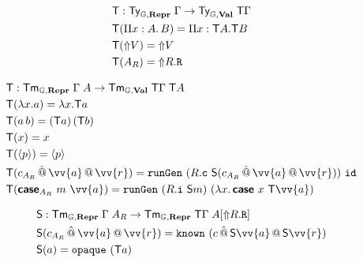 \begin{align*}
   & {\textsf{T}}            : {\textsf{Ty}}_{{\mathbb{G}}, \textbf{Repr}} \; {\Gamma} \to {\textsf{Ty}}_{{\mathbb{G}}, \textbf{Val}}\; {\textsf{T}} \Gamma \\
   & {\textsf{T}}(\Pi x : A .\, B)  = \Pi x : {\textsf{T}} A . {\textsf{T}} B                                \\
   & {\textsf{T}}(\text{$\Uparrow$}{V}) = \text{$\Uparrow$}{V}                                                             \\
   & {\textsf{T}}(A_R) = \text{$\Uparrow$}{R}.\texttt{R}
\end{align*}

\begin{align*}
   & \fun T            : \Tm_{\catG, \mR} \; {\Gamma} \; A \to \Tm_{\catG, \mV}\; {\fun T \Gamma} \; \fun T A                                               \\
   & \fun T(\lambda x . a)  = \lambda x . \fun T a                                                                                                          \\
   & \fun T(a \, b)  = (\fun T a) \, (\fun T b)                                                                                                             \\
   & \fun T(x) = x                                                                                                                                          \\
   & \fun T(\quot {p}) = \quot {p}                                                                                                                          \\
   & \fun T(c_{A_R} \, \hat{@} \, \vv{a} \,@\, \vv{r}) =  \defin{runGen} \ (R.\defin{c} \ \fun S (c_{A_R} \, \hat{@} \, \vv{a} \,@\, \vv{r})) \  \defin{id} \\
   & \fun T(\inte{case}_{A_R}\ m\ \vv{a}) =  \defin{runGen} \ (R.\defin{i} \ \fun S m) \  (\lambda x.\, \inte{case}\ x \ \fun T\vv{a})                      \\
\end{align*}

\begin{align*}
   & \fun S            : \Tm_{\catG, \mR} \; {\Gamma} \; A_R \to \Tm_{\catG,\mR}\; {\fun T \Gamma} \; A[\lift{R.\defin{R}}] \\
   & \fun S(c_{A_R} \, \hat{@} \, \vv{a} \,@\, \vv{r}) = \defin{known}\ (c \, \hat{@} \, \fun S\vv{a} \,@\, \fun S\vv{r})   \\
   & \fun S(a)  = \defin{opaque}\ (\fun T a)
\end{align*}

